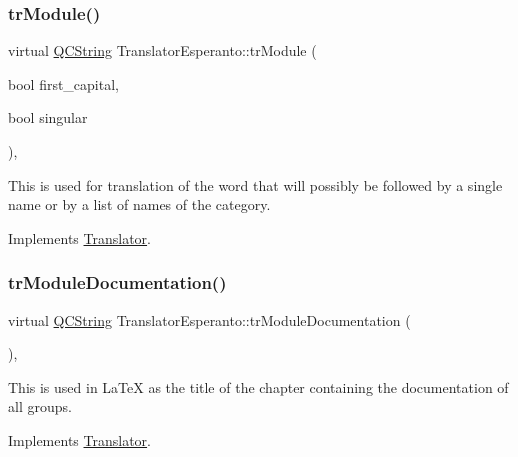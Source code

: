 \mbox{\label{class_translator_esperanto_a889ab29e279e06bd315d868881aa949a}} 
\subsubsection{\texorpdfstring{trModule()}{trModule()}}
{\footnotesize\ttfamily virtual \mbox{\hyperlink{class_q_c_string}{Q\+C\+String}} Translator\+Esperanto\+::tr\+Module (\begin{DoxyParamCaption}\item[{bool}]{first\+\_\+capital,  }\item[{bool}]{singular }\end{DoxyParamCaption})\hspace{0.3cm}{\ttfamily [inline]}, {\ttfamily [virtual]}}

This is used for translation of the word that will possibly be followed by a single name or by a list of names of the category. 

Implements \mbox{\hyperlink{class_translator}{Translator}}.

\mbox{\label{class_translator_esperanto_aa185921e557e4d14e6ea7464b7857701}} 
\subsubsection{\texorpdfstring{trModuleDocumentation()}{trModuleDocumentation()}}
{\footnotesize\ttfamily virtual \mbox{\hyperlink{class_q_c_string}{Q\+C\+String}} Translator\+Esperanto\+::tr\+Module\+Documentation (\begin{DoxyParamCaption}{ }\end{DoxyParamCaption})\hspace{0.3cm}{\ttfamily [inline]}, {\ttfamily [virtual]}}

This is used in La\+TeX as the title of the chapter containing the documentation of all groups. 

Implements \mbox{\hyperlink{class_translator}{Translator}}.

\mbox{\label{class_translator_esperanto_a57ac90bfce144ec06f088679d2e3a415}} 
